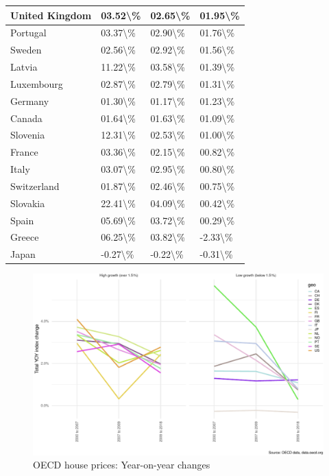 \documentclass[
]{book}
\begin{document}
\begin{table}
\begin{tabular}[t]{l|l|l|l}
\hline
United Kingdom & 03.52\textbackslash{}\% & 02.65\textbackslash{}\% & 01.95\textbackslash{}\%\\
\hline
Portugal & 03.37\textbackslash{}\% & 02.90\textbackslash{}\% & 01.76\textbackslash{}\%\\
\hline
Sweden & 02.56\textbackslash{}\% & 02.92\textbackslash{}\% & 01.56\textbackslash{}\%\\
\hline
Latvia & 11.22\textbackslash{}\% & 03.58\textbackslash{}\% & 01.39\textbackslash{}\%\\
\hline
Luxembourg & 02.87\textbackslash{}\% & 02.79\textbackslash{}\% & 01.31\textbackslash{}\%\\
\hline
Germany & 01.30\textbackslash{}\% & 01.17\textbackslash{}\% & 01.23\textbackslash{}\%\\
\hline
Canada & 01.64\textbackslash{}\% & 01.63\textbackslash{}\% & 01.09\textbackslash{}\%\\
\hline
Slovenia & 12.31\textbackslash{}\% & 02.53\textbackslash{}\% & 01.00\textbackslash{}\%\\
\hline
France & 03.36\textbackslash{}\% & 02.15\textbackslash{}\% & 00.82\textbackslash{}\%\\
\hline
Italy & 03.07\textbackslash{}\% & 02.95\textbackslash{}\% & 00.80\textbackslash{}\%\\
\hline
Switzerland & 01.87\textbackslash{}\% & 02.46\textbackslash{}\% & 00.75\textbackslash{}\%\\
\hline
Slovakia & 22.41\textbackslash{}\% & 04.09\textbackslash{}\% & 00.42\textbackslash{}\%\\
\hline
Spain & 05.69\textbackslash{}\% & 03.72\textbackslash{}\% & 00.29\textbackslash{}\%\\
\hline
Greece & 06.25\textbackslash{}\% & 03.82\textbackslash{}\% & -2.33\textbackslash{}\%\\
\hline
Japan & -0.27\textbackslash{}\% & -0.22\textbackslash{}\% & -0.31\textbackslash{}\%\\
\hline
\end{tabular}
\end{table}

\begin{figure}
\centering
\includegraphics{figures/oecd-house-prices-1.pdf}
\caption{\label{fig:oecd-house-prices}OECD house prices: Year-on-year changes}
\end{figure}
\end{document}
